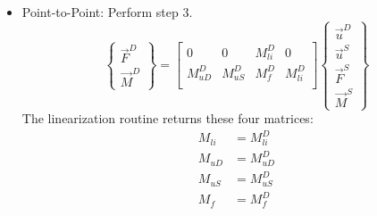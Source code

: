 \documentclass[10pt,letterpaper,oneside,notitlepage]{article}
\begin{document}
\begin{itemize}
	
  \item Point-to-Point: Perform step 3.
				\begin{equation}
				\left\{	\begin{matrix} \vec{F}^{D} \\ \vec{M}^{D} \end{matrix} \right\} 
			=
				\begin{bmatrix}
				0 							 & 0  								 & M_{li}^{D} & 0          \\
				M_{uD}^{D} 		   & M_{uS}^{D}    		   & M_{f}^{D}  & M_{li}^{D} \\
				\end{bmatrix}
				\left\{	\begin{matrix} \vec{u}^D \\ \vec{u}^{S}  \\ \vec{F}^{S}  \\ \vec{M}^{S} \end{matrix} \right\} 
			\end{equation}		
	The linearization routine returns these four matrices:
	\begin{align} M_{li} &= M_{li}^D \\ 
	 M_{uD} &= M_{uD}^D \\ 
	 M_{uS} &= M_{uS}^D \\ 
	 M_{f}  &= M_{f}^D  \end{align} 
	
\end{itemize}
\end{document}
